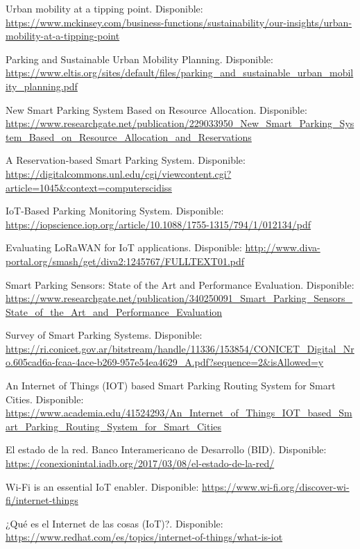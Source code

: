 \begin{references}
    Urban mobility at a tipping point. Disponible: \url{https://www.mckinsey.com/business-functions/sustainability/our-insights/urban-mobility-at-a-tipping-point}

    Parking and Sustainable Urban Mobility Planning. Disponible:
    \url{https://www.eltis.org/sites/default/files/parking_and_sustainable_urban_mobility_planning.pdf}

    New Smart Parking System Based on Resource Allocation. Disponible:
    \url{https://www.researchgate.net/publication/229033950_New_Smart_Parking_System_Based_on_Resource_Allocation_and_Reservations}

    A Reservation-based Smart Parking System. Disponible:
    \url{https://digitalcommons.unl.edu/cgi/viewcontent.cgi?article=1045&context=computerscidiss}

    IoT-Based Parking Monitoring System. Disponible:
    \url{https://iopscience.iop.org/article/10.1088/1755-1315/794/1/012134/pdf}

    Evaluating LoRaWAN for IoT applications. Disponible:
    \url{http://www.diva-portal.org/smash/get/diva2:1245767/FULLTEXT01.pdf}

    Smart Parking Sensors: State of the Art and Performance Evaluation. Disponible:
    \url{https://www.researchgate.net/publication/340250091_Smart_Parking_Sensors_State_of_the_Art_and_Performance_Evaluation}

    Survey of Smart Parking Systems. Disponible:
    \url{https://ri.conicet.gov.ar/bitstream/handle/11336/153854/CONICET_Digital_Nro.605cad6a-fcaa-4ace-b269-957e54ea4629_A.pdf?sequence=2&isAllowed=y}

    An Internet of Things (IOT) based Smart Parking Routing System for Smart Cities. Disponible:
    \url{https://www.academia.edu/41524293/An_Internet_of_Things_IOT_based_Smart_Parking_Routing_System_for_Smart_Cities}

    El estado de la red. Banco Interamericano de Desarrollo (BID). Disponible:
    \url{https://conexionintal.iadb.org/2017/03/08/el-estado-de-la-red/}

    Wi-Fi is an essential IoT enabler. Disponible:
    \url{https://www.wi-fi.org/discover-wi-fi/internet-things}

    ¿Qué es el Internet de las cosas (IoT)?. Disponible:
    \url{https://www.redhat.com/es/topics/internet-of-things/what-is-iot}


\end{references}
